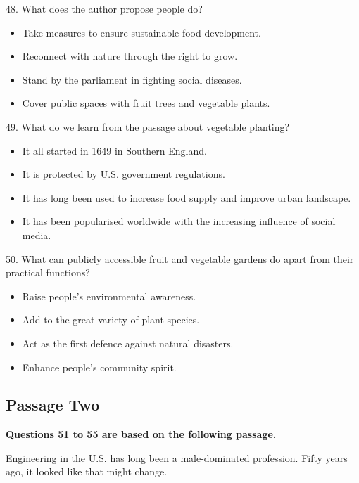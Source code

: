 \documentclass[UTF8,11pt]{ctexart}
\begin{document}
48. What does the author propose people do?


\begin{itemize}[leftmargin=2em,itemsep=.2em,topsep=.4em]\item[A.] Take measures to ensure sustainable food development.
\item[B.] Reconnect with nature through the right to grow.
\item[C.] Stand by the parliament in fighting social diseases.
\item[D.] Cover public spaces with fruit trees and vegetable plants.
\end{itemize}

49. What do we learn from the passage about vegetable planting?


\begin{itemize}[leftmargin=2em,itemsep=.2em,topsep=.4em]\item[A.] It all started in 1649 in Southern England.
\item[B.] It is protected by U.S. government regulations.
\item[C.] It has long been used to increase food supply and improve urban landscape.
\item[D.] It has been popularised worldwide with the increasing influence of social media.
\end{itemize}

50. What can publicly accessible fruit and vegetable gardens do apart from their practical functions?


\begin{itemize}[leftmargin=2em,itemsep=.2em,topsep=.4em]\item[A.] Raise people’s environmental awareness.
\item[B.] Add to the great variety of plant species.
\item[C.] Act as the first defence against natural disasters.
\item[D.] Enhance people’s community spirit.
\end{itemize}

\subsection*{\textbf{Passage Two}}


\textbf{Questions 51 to 55 are based on the following passage.}


Engineering in the U.S. has long been a male-dominated profession. Fifty years ago, it looked like that might change.
\end{document}
